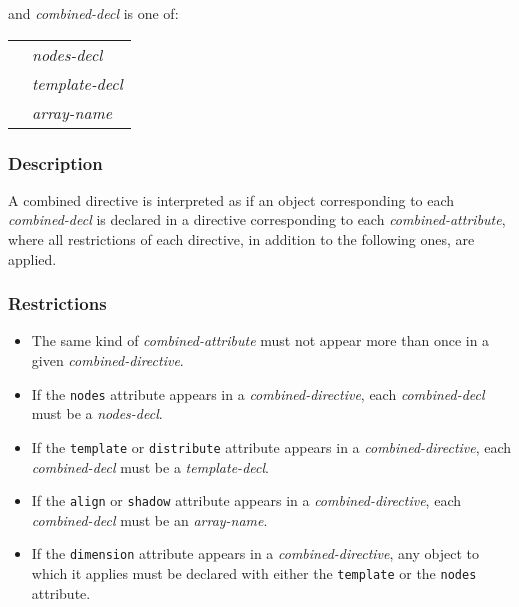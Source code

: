 \vspace{0.3cm}

and {\it combined-decl} is one of:

\vspace{0.3cm}

\begin{tabular}{ll}
 \hspace{0.5cm} & {\it nodes-decl} \\
 & {\it template-decl} \\
 & {\it array-name}
\end{tabular}

\subsubsection*{Description}

A combined directive is interpreted as if an object corresponding to
each {\it combined-decl} is declared in a directive corresponding to
each {\it combined-attribute}, where all restrictions of each directive,
in addition to the following ones, are applied.

\subsubsection*{Restrictions}

\begin{itemize}
 \item The same kind of {\it combined-attribute} must not appear more
       than once in a given {\it combined-directive}.
 \item If the {\tt nodes} attribute appears in a {\it
       combined-directive}, each {\it combined-decl} must be a {\it
       nodes-decl}.
 \item If the {\tt template} or {\tt distribute} attribute appears in a
       {\it combined-directive}, each {\it combined-decl} must be a {\it
       template-decl}.
 \item If the {\tt align} or {\tt shadow} attribute appears in a
       {\it combined-directive}, each {\it combined-decl} must be an
       {\it array-name}.
 \item If the {\tt dimension} attribute appears in a {\it
       combined-directive}, any object to which it applies must be
       declared with either the {\tt template} or the {\tt nodes}
       attribute.
\end{itemize}

